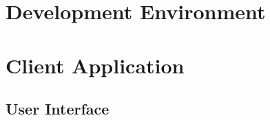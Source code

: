 \section{Development Environment}

\section{Client Application}
\subsection{User Interface}





%
%
%

